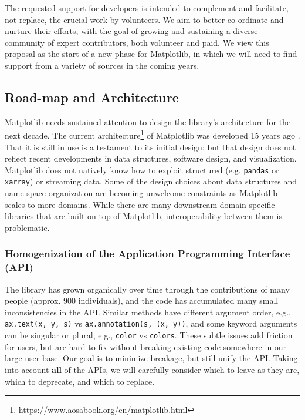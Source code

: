 \documentclass[11pt]{article}  %
\begin{document}
The requested support for developers is intended to complement and
facilitate, not replace, the crucial work by volunteers.  We aim to
better co-ordinate and nurture their
efforts, with the goal of growing and sustaining a diverse community
of expert contributors, both volunteer and paid.  We view
this proposal as the start of a new phase for Matplotlib, in which we
will need to find support from a variety of sources in the coming years.



\subsection{Road-map and Architecture}

Matplotlib needs sustained attention to design the library's
architecture for the next decade.  The current
architecture\footnote{\url{https://www.aosabook.org/en/matplotlib.html}} of
Matplotlib was developed 15 years ago \cite{Hunter:2007}.  That it is
still in use is a testament to its initial design; but that design
does not reflect recent developments in data structures, software
design, and visualization.  Matplotlib does not natively know how to
exploit structured (e.g. \texttt{pandas} or \texttt{xarray}) or
streaming data.  Some of the design choices about data structures and
name space organization are
becoming unwelcome constraints as Matplotlib scales to more domains.  While
there are many downstream domain-specific libraries that are built on
top of Matplotlib, interoperability between them is problematic.


\subsubsection{Homogenization of the Application Programming Interface (API)}
\label{sec:api_hom}
The library has grown organically over time through the contributions
of many people (approx. 900 individuals), and the code has accumulated
many small inconsistencies in the API.  Similar methods have different
argument order, e.g., \texttt{ax.text(x, y, s)} vs
\texttt{ax.annotation(s, (x, y))}, and some keyword arguments can be
singular or plural, e.g., \texttt{color} vs \texttt{colors}.  These
subtle issues add friction for users, but are hard to fix without
breaking existing code somewhere in our large user base.  Our goal is
to minimize breakage, but still unify the API.  Taking into account
\textbf{all} of the APIs, we will carefully consider which to leave as
they are, which to deprecate, and which to replace.
\end{document}
